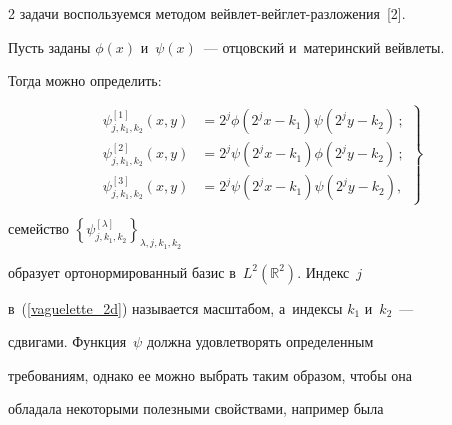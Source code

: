 \begin{multicols}{2}
 задачи воспользуемся методом вейв\-лет-вейг\-лет-раз\-ло\-же\-ния~[2].





Пусть заданы $\phi(x)$ и~$\psi(x)$~--- отцовский и~материнский вейвлеты.


Тогда можно определить:





\vspace*{2pt}





\noindent


\begin{equation}


\left.


\begin{array}{rl}


\psi_{j,k_1,k_2}^{[1]} (x,y) &= 2^j \phi(2^j x - k_1) \psi(2^j y - k_2)\,;\\[9pt]


\psi_{j,k_1,k_2}^{[2]} (x,y) &= 2^j \psi(2^j x - k_1) \phi(2^j y - k_2)\,;\\[9pt]


\psi_{j,k_1,k_2}^{[3]} (x,y) &= 2^j \psi(2^j x - k_1) \psi(2^j y - k_2),


\end{array}


\right\}


\label{vaguelette_2d}


\end{equation}





\vspace*{-2pt}





\noindent


семейство $\left\{\psi^{[\lambda]}_{j,k_1,k_2}\right\}_{\lambda,j,k_1,k_2}$


образует ортонормированный базис в~$L^2(\mathbb{R}^2)$. Индекс~$j$


в~(\ref{vaguelette_2d}) называется масштабом, а~индексы $k_1$ и~$k_2$~---


сдвигами. Функция~$\psi$ должна удовлетворять определенным


требованиям, однако ее можно выбрать таким образом, чтобы она


обладала некоторыми полезными свойствами, например была



\end{multicols}
